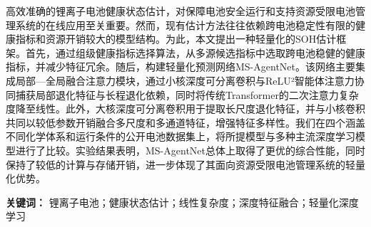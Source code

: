 高效准确的锂离子电池健康状态估计，对保障电池安全运行和支持资源受限电池管理系统的在线应用至关重要。然而，现有估计方法往往依赖跨电池稳定性有限的健康指标和资源开销较大的模型结构。为此，本文提出一种轻量化的SOH估计框架。首先，通过组级健康指标选择算法，从多源候选指标中选取跨电池稳健的健康指标，并减少特征冗余。随后，构建轻量化预测网络MS-AgentNet。该网络主要集成局部—全局融合注意力模块，通过小核深度可分离卷积与ReLU²智能体注意力协同捕获局部退化特征与长程退化依赖，同时将传统Transformer的二次注意力复杂度降至线性。此外，大核深度可分离卷积用于提取长尺度退化特征，并与小核卷积共同以较低参数开销融合多尺度和多通道特征，增强特征多样性。我们在四个涵盖不同化学体系和运行条件的公开电池数据集上，将所提模型与多种主流深度学习模型进行了比较。实验结果表明，MS-AgentNet总体上取得了更优的综合性能，同时保持了较低的计算与存储开销，进一步体现了其面向资源受限电池管理系统的轻量化优势。

\textbf{关键词：} 锂离子电池；健康状态估计；线性复杂度；深度特征融合；轻量化深度学习
